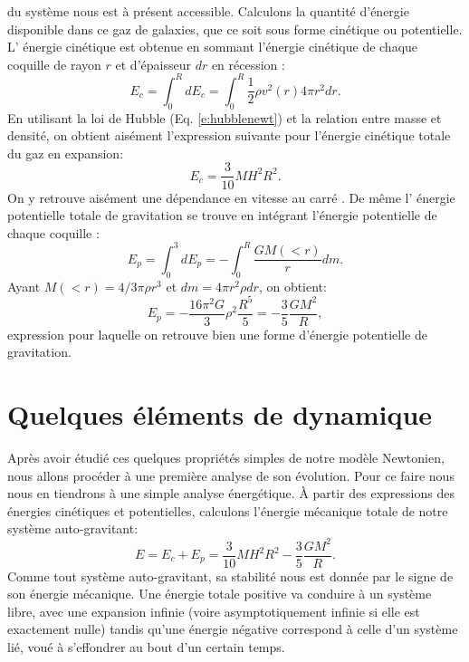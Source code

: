  du système nous est à présent accessible. Calculons la quantité d'énergie disponible dans ce gaz de galaxies, que ce soit sous forme cinétique ou potentielle. L' énergie cinétique  est obtenue en sommant l'énergie cinétique de chaque coquille de rayon $r$ et d'épaisseur $dr$ en récession :
\begin{equation}
E_c=\int_0^R dE_c=\int_0^R \frac{1}{2}\rho  v^2(r) 4\pi r^2  dr.
\end{equation}
En utilisant la loi de Hubble (Eq. \ref{e:hubblenewt}) et la relation entre masse et densité, on obtient aisément l'expression suivante pour l'énergie cinétique totale du gaz en expansion:
\begin{equation}
E_c=\frac{3}{10} M H^2 R^2.
\end{equation}
On y retrouve aisément une dépendance en vitesse au carré . De même l' énergie potentielle  totale de gravitation se trouve en intégrant l'énergie potentielle de chaque coquille :
\begin{equation}
E_p=\int_0^3 dE_p=-\int_0^R \frac{GM(<r)}{r}dm.
\end{equation}
Ayant $M(<r)=4/3\pi \rho r^3$ et $dm= 4\pi r^2 \rho dr$, on obtient:
\begin{equation}
E_p=-\frac{16 \pi^2 G}{3} \rho^2 \frac{R^5}{5}= -\frac{3}{5}\frac{GM^2}{R},
\end{equation} 
expression pour laquelle on retrouve bien une forme d'énergie potentielle de gravitation.

\section{Quelques éléments de dynamique}
Après avoir étudié ces quelques propriétés simples de notre modèle Newtonien, nous allons procéder à une première analyse de son évolution. Pour ce faire nous nous en tiendrons à une simple analyse énergétique. À partir des expressions des énergies cinétiques et potentielles, calculons l'énergie mécanique  totale de notre système auto-gravitant:
\begin{equation}
E=E_c+E_p=\frac{3}{10} M H^2 R^2 - \frac{3}{5}\frac{GM^2}{R}.
\end{equation}
Comme tout système auto-gravitant, sa stabilité nous est donnée par le signe de son énergie mécanique. Une énergie totale positive va conduire à un système libre, avec une expansion infinie (voire asymptotiquement infinie si elle est exactement nulle) tandis qu'une énergie négative correspond à celle d'un système lié, voué à s'effondrer au bout d'un certain temps.

